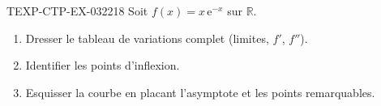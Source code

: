\begin{exercice}{TEXP-CTP-EX-032}{2}{18}
Soit $f(x) = x\,\mathrm{e}^{-x}$ sur $\mathbb{R}$.
\begin{enumerate}
  \item Dresser le tableau de variations complet (limites, $f'$, $f''$).
  \item Identifier les points d'inflexion.
  \item Esquisser la courbe en placant l'asymptote et les points remarquables.
\end{enumerate}

\end{exercice}
